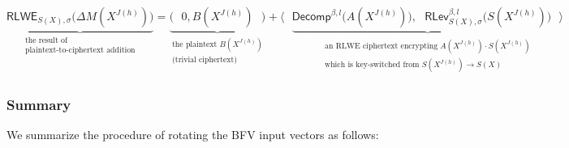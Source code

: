 $ $

\noindent $\underbrace{\textsf{RLWE}_{S(X),\sigma}\bm{(}\Delta M(X^{J(h)})\bm{)}}_{\substack{\text{the result of} \\ \text{plaintext-to-ciphertext addition}}} = \underbrace{\bm{(} \text{ } 0, B(X^{J(h)}) \text{ } \bm{)}}_{\substack{\text{the plaintext } B(X^{J(h)}) \\ \text{(trivial ciphertext)}}} + \bm{\langle} \text{ } \underbrace{\textsf{Decomp}^{\beta, l}\bm{(}A(X^{J(h)})\bm{)}, \text{ } \textsf{RLev}_{S(X), \sigma}^{\beta, l}\bm{(}S(X^{J(h)})\bm{)} \text{ } \bm{\rangle}}_{\substack{\substack{\text{an RLWE ciphertext encrypting $A(X^{J(h)}) \cdot S(X^{J(h)})$}\\ \text{which is key-switched from $S(X^{J(h)})\rightarrow S(X)$}}}}$



\subsubsection{Summary}
\label{subsubsec:bfv-rotation-summary}

We summarize the procedure of rotating the BFV input vectors as follows: 

